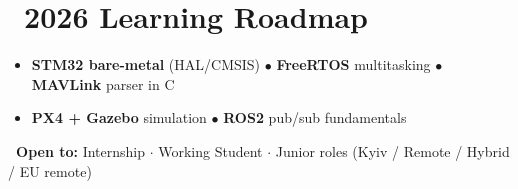 \documentclass[10pt,a4paper,sans]{moderncv}
\begin{document}
\section{\faRoad\ 2026 Learning Roadmap}
\begin{itemize}
    \item[\faChevronRight] \small \textbf{STM32 bare-metal} (HAL/CMSIS) $\bullet$ \textbf{FreeRTOS} multitasking $\bullet$ \textbf{MAVLink} parser in C
    \item[\faChevronRight] \small \textbf{PX4 + Gazebo} simulation $\bullet$ \textbf{ROS2} pub/sub fundamentals
\end{itemize}

\vspace{0.3em}
\small\textbf{\faPaperPlane\ Open to:} Internship $\cdot$ Working Student $\cdot$ Junior roles \quad (Kyiv / Remote / Hybrid / EU remote)
\end{document}
